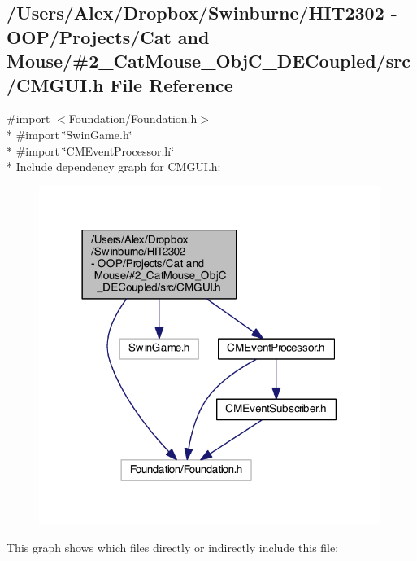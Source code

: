\subsection{/\-Users/\-Alex/\-Dropbox/\-Swinburne/\-H\-I\-T2302 -\/ O\-O\-P/\-Projects/\-Cat and Mouse/\#2\-\_\-\-Cat\-Mouse\-\_\-\-Obj\-C\-\_\-\-D\-E\-Coupled/src/\-C\-M\-G\-U\-I.h File Reference}
\label{_c_m_g_u_i_8h}
{\ttfamily \#import $<$Foundation/\-Foundation.\-h$>$}\\*
{\ttfamily \#import \char`\"{}Swin\-Game.\-h\char`\"{}}\\*
{\ttfamily \#import \char`\"{}C\-M\-Event\-Processor.\-h\char`\"{}}\\*
Include dependency graph for C\-M\-G\-U\-I.\-h\-:
\nopagebreak
\begin{figure}[H]
\begin{center}
\leavevmode
\includegraphics[width=314pt]{_c_m_g_u_i_8h__incl}
\end{center}
\end{figure}
This graph shows which files directly or indirectly include this file\-:
\nopagebreak
